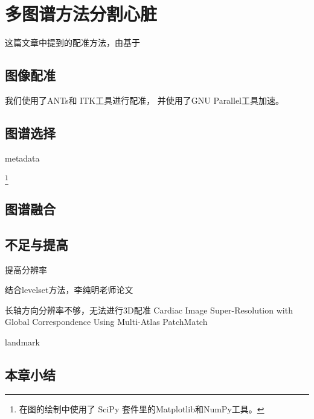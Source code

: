 
\chapter{多图谱方法分割心脏}

这篇文章中提到的配准方法，由基于

\section{图像配准}

我们使用了ANTs和
ITK工具进行配准，
并使用了GNU Parallel工具加速。

\section{图谱选择}

metadata\par
\footnote{在图的绘制中使用了
SciPy
套件里的Matplotlib和NumPy工具。}

\section{图谱融合}

\section{不足与提高}

提高分辨率

结合levelset方法，李纯明老师论文

长轴方向分辨率不够，无法进行3D配准
Cardiac Image Super-Resolution with Global Correspondence Using Multi-Atlas PatchMatch

landmark\par
\section{本章小结}
